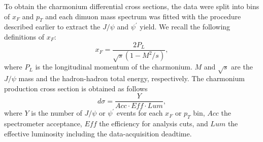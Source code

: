 \documentclass[reprint,aps,unsortedaddress,superscriptaddress,prd,floatfix,showpacs,linenumbers]{revtex4-2}
\begin{document}

To obtain the charmonium differential cross sections,
the data were split into bins of $x_F$ and $p_T$ and each dimuon mass 
spectrum was fitted with the procedure described earlier 
to extract the $J/\psi$ and $\psi^\prime$ yield.
We recall the following definitions of $x_F$:
\begin{equation}
x_F = \frac{2P_L}{\sqrt s (1-M^2/s)},
\label{eq:eq1}
\end{equation}
where $P_L$ is the longitudinal momentum of the charmonium.
$M$ and $\sqrt s$ are the $J/\psi$ mass and the hadron-hadron total
energy, respectively.   
The charmonium production cross section is obtained as follows
\begin{equation}
d\sigma = \frac{Y}{Acc \cdot Eff \cdot Lum}, 
\label{eq:eq2}
\end{equation}    
where $Y$ is the number of $J/\psi$ or $\psi^\prime$ events
for each $x_F$ or $p_T$ bin, $Acc$ the spectrometer acceptance, 
$Eff$ the efficiency for  analysis cuts, and $Lum$ the effective 
luminosity including the data-acquisition deadtime. 
\end{document}
